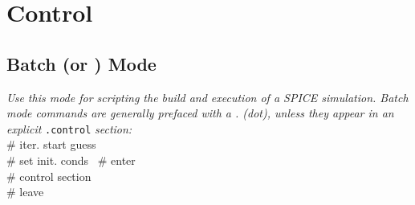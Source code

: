 \section{Control}

\subsection*{Batch (or ) Mode}
\textit{Use this mode for scripting the build and execution of a SPICE simulation. Batch mode commands are generally prefaced with a . (dot), unless they appear in an explicit }\texttt{.control}\textit{ section:}\\
 \# iter. start guess\\
 \# set init. cond\textquotesingle s\
 \# enter \\
\mycolX{40mm}{\code{\dots}} \# control section \\
 \# leave \\



